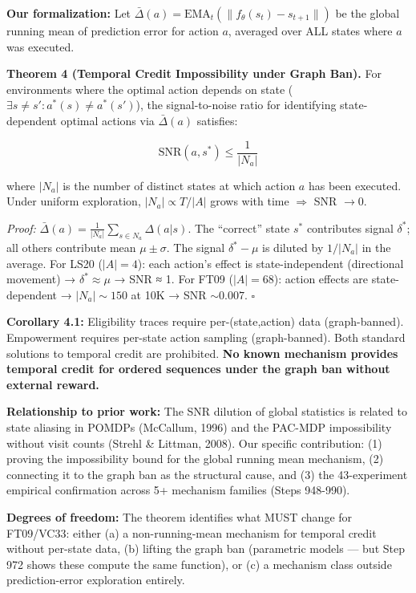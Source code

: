 \documentclass[
  11pt,
]{article}
\begin{document}
\textbf{Our formalization:} Let
\(\bar{\Delta}(a) = \text{EMA}_t(\|f_\theta(s_t) - s_{t+1}\|)\) be the
global running mean of prediction error for action \(a\), averaged over
ALL states where \(a\) was executed.

\textbf{Theorem 4 (Temporal Credit Impossibility under Graph Ban).} For
environments where the optimal action depends on state
(\(\exists s \neq s': a^*(s) \neq a^*(s')\)), the signal-to-noise ratio
for identifying state-dependent optimal actions via \(\bar{\Delta}(a)\)
satisfies:

\[\text{SNR}(a, s^*) \leq \frac{1}{|N_a|}\]

where \(|N_a|\) is the number of distinct states at which action \(a\)
has been executed. Under uniform exploration, \(|N_a| \propto T/|A|\)
grows with time \(\Rightarrow\) SNR \(\to 0\).

\emph{Proof:}
\(\bar{\Delta}(a) = \frac{1}{|N_a|}\sum_{s \in N_a} \Delta(a|s)\). The
``correct'' state \(s^*\) contributes signal \(\delta^*\); all others
contribute mean \(\mu \pm \sigma\). The signal \(\delta^* - \mu\) is
diluted by \(1/|N_a|\) in the average. For LS20 (\(|A|=4\)): each
action's effect is state-independent (directional movement) →
\(\delta^* \approx \mu\) → SNR ≈ 1. For FT09 (\(|A|=68\)): action
effects are state-dependent → \(|N_a| \sim 150\) at 10K → SNR
\(\sim 0.007\). \(\square\)

\textbf{Corollary 4.1:} Eligibility traces require per-(state,action)
data (graph-banned). Empowerment requires per-state action sampling
(graph-banned). Both standard solutions to temporal credit are
prohibited. \textbf{No known mechanism provides temporal credit for
ordered sequences under the graph ban without external reward.}

\textbf{Relationship to prior work:} The SNR dilution of global
statistics is related to state aliasing in POMDPs (McCallum, 1996) and
the PAC-MDP impossibility without visit counts (Strehl \& Littman,
2008). Our specific contribution: (1) proving the impossibility bound
for the global running mean mechanism, (2) connecting it to the graph
ban as the structural cause, and (3) the 43-experiment empirical
confirmation across 5+ mechanism families (Steps 948-990).

\textbf{Degrees of freedom:} The theorem identifies what MUST change for
FT09/VC33: either (a) a non-running-mean mechanism for temporal credit
without per-state data, (b) lifting the graph ban (parametric models ---
but Step 972 shows these compute the same function), or (c) a mechanism
class outside prediction-error exploration entirely.
\end{document}
